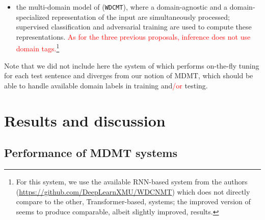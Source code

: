 \documentclass[11pt,a4paper]{article}
\newcommand{\fyDone}[1]{\done[FY]\Todo[FY:]{\textcolor{orange}{#1}}}
\newcommand{\revision}[1]{\textcolor{red}{#1}}
\newcommand{\system}[1]{\texttt{{#1}}}
\begin{document}
\begin{itemize}
\item the multi-domain model of  (\system{WDCMT}), where a domain-agnostic and a domain-specialized representation of the input are simultaneously processed; supervised classification and adversarial training are used to compute these representations. \revision{As for the three previous proposals, inference does not use domain tags.}\footnote{For this system, we use the available RNN-based system from the authors (\url{https://github.com/DeepLearnXMU/WDCNMT}\fyDone{URLs}) which does not directly compare to the other, Transformer-based, systems; the improved version of \cite{Su19exploring} seems to produce comparable, albeit slightly improved, results.}\fyDone{Check this}
\end{itemize}

Note that we did not include here the system of \cite{Farajian17multidomain} which performs on-the-fly tuning for each test sentence and diverges from our notion of MDMT, which should be able to handle available domain labels in training and\revision{/or} testing.

\section{Results and discussion \label{sec:results}}

\subsection{Performance of MDMT systems \label{ssec:rawperformance}}
\end{document}
